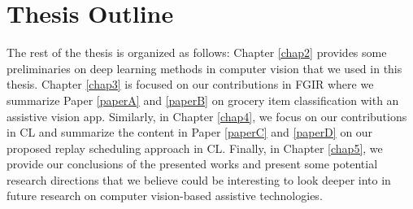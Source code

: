 \section{Thesis Outline}\label{chap1:sec:outline}
The rest of the thesis is organized as follows: Chapter \ref{chap2} provides some preliminaries on deep learning methods in computer vision that we used in this thesis. Chapter \ref{chap3} is focused on our contributions in FGIR where we summarize Paper \ref{paperA} and \ref{paperB} on grocery item classification with an assistive vision app. Similarly, in Chapter \ref{chap4}, we focus on our contributions in CL and summarize the content in Paper \ref{paperC} and \ref{paperD} on our proposed replay scheduling approach in CL. Finally, in Chapter \ref{chap5}, we provide our conclusions of the presented works and present some potential research directions that we believe could be interesting to look deeper into in future research on computer vision-based assistive technologies. 
